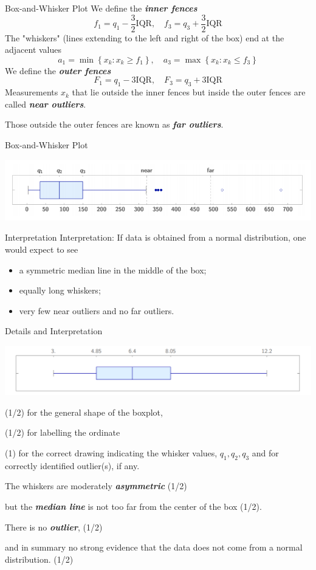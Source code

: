 \documentclass{beamer}
\newcommand{\bb}[1]{\textcolor{antiquefuchsia}{\textbf{\textit{#1}}}}
\begin{document}
\begin{frame}{Box-and-Whisker Plot}
We define the \bb{inner fences}
$$
f_{1}=q_{1}-\frac{3}{2} \mathrm{IQR}, \quad f_{3}=q_{3}+\frac{3}{2} \mathrm{IQR}
$$
The "whiskers" (lines extending to the left and right of the box) end at the adjacent values
$$
a_{1}=\min \left\{x_{k}: x_{k} \geq f_{1}\right\}, \quad a_{3}=\max \left\{x_{k}: x_{k} \leq f_{3}\right\}
$$
We define the \bb{outer fences}
$$
F_{1}=q_{1}-3 \mathrm{IQR}, \quad F_{3}=q_{3}+3 \mathrm{IQR}
$$
Measurements $x_{k}$ that lie outside the inner fences but inside the outer fences are called \bb{near outliers}. 

Those outside the outer fences are known as \bb{far outliers}.
\end{frame}

\begin{frame}{Box-and-Whisker Plot}
\begin{center}
\includegraphics[scale=0.45]{box.png}
\end{center}
\begin{block}{Interpretation}
Interpretation: If data is obtained from a normal distribution, one would expect to see
\begin{itemize}
\item a symmetric median line in the middle of the box;
\item equally long whiskers;
\item very few near outliers and no far outliers.
\end{itemize}
\end{block}
\end{frame}

\begin{frame}{Details and Interpretation}
\begin{center}
\includegraphics[scale=0.3]{ex2.png}
\end{center}
(1/2) for the general shape of the boxplot,

(1/2) for labelling the ordinate

(1) for the correct drawing indicating the whisker values, $q_{1}, q_{2}, q_{3}$ and for correctly identified outlier(s), if any.


The whiskers are moderately \bb{asymmetric} (1/2)

but the \bb{median line} is not too far from the center of the box (1/2).

There is no \bb{outlier}, (1/2)

and in summary no strong evidence that the data does not come from a normal distribution. (1/2)
\end{frame}
\end{document}
